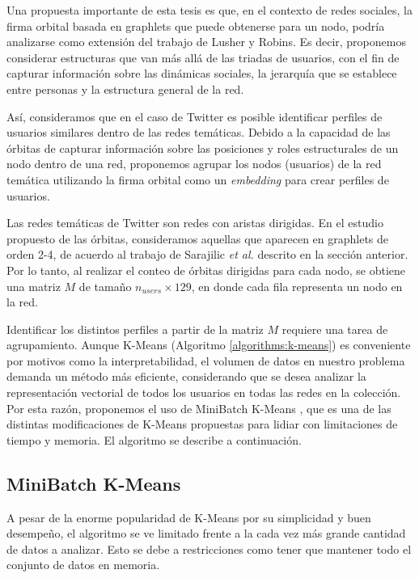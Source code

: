Una propuesta importante de esta tesis es que, en el contexto de redes sociales, la firma orbital basada en graphlets que puede obtenerse para un nodo, podría analizarse como extensión del trabajo de Lusher y Robins. Es decir, proponemos considerar estructuras que van más allá de las triadas de usuarios, con el fin de capturar información sobre las dinámicas sociales, la jerarquía que se establece entre personas y la estructura general de la red. 

Así, consideramos que en el caso de Twitter es posible identificar perfiles de usuarios similares dentro de las redes temáticas. Debido a la capacidad de las órbitas de capturar información sobre las posiciones y roles estructurales de un nodo dentro de una red, proponemos agrupar los nodos (usuarios) de la red temática utilizando la firma orbital como un \textit{embedding} para crear perfiles de usuarios.

Las redes temáticas de Twitter son redes con aristas dirigidas. En el estudio propuesto de las órbitas, consideramos aquellas que aparecen en graphlets de orden 2-4, de acuerdo al trabajo de Sarajilic \textit{et al.} descrito en la sección anterior.  Por lo tanto, al realizar el conteo de órbitas dirigidas para cada nodo, se obtiene una matriz $M$ de tamaño $n_{users}\times 129$, en donde cada fila representa un nodo en la red. 


Identificar los distintos perfiles a partir de la matriz $M$ requiere una tarea de agrupamiento. 
Aunque K-Means (Algoritmo \ref{algorithms:k-means}) es conveniente por motivos como la interpretabilidad, el volumen de datos en nuestro problema demanda un método más eficiente, considerando que se desea analizar la representación vectorial de todos los usuarios en todas las redes en la colección. Por esta razón, proponemos el uso de MiniBatch K-Means \cite{sculley_web-scale_2010}, que es una de las distintas modificaciones de K-Means propuestas para lidiar con limitaciones de tiempo y memoria. El algoritmo se describe a continuación. 

\subsection{MiniBatch K-Means}
A pesar de la enorme popularidad de K-Means por su simplicidad y buen desempeño, el algoritmo se ve limitado frente a la cada vez más grande cantidad de datos a analizar. Esto se debe a restricciones como tener que mantener todo el conjunto de datos en memoria. 

